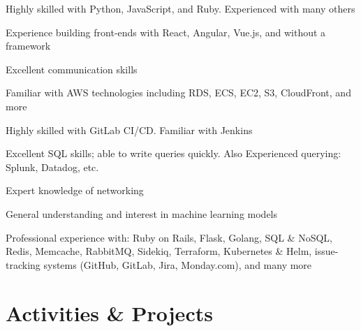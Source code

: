 \documentclass[margin,line]{resume}
\begin{document}
\begin{resume}
    \begin{list2}
        \item Highly skilled with Python, JavaScript, and Ruby. Experienced with many others
        \item Experience building front-ends with React, Angular, Vue.js, and without a framework
        \item Excellent communication skills
        \item Familiar with AWS technologies including RDS, ECS, EC2, S3, CloudFront, and more
        \item Highly skilled with GitLab CI/CD. Familiar with Jenkins
        \item Excellent SQL skills; able to write queries quickly. Also Experienced querying: Splunk, Datadog, etc.
        \item Expert knowledge of networking
        \item General understanding and interest in machine learning models
        \vspace{3mm}
        \item Professional experience with: Ruby on Rails, Flask, Golang, SQL \& NoSQL, Redis, Memcache, RabbitMQ, Sidekiq, Terraform, Kubernetes \& Helm, issue-tracking systems (GitHub, GitLab, Jira, Monday.com), and many more
    \end{list2}\vspace{-1.5mm}

\sectionline
    \section{\mysidestyle \textbf{\large{A}\small{ctivities \& Projects}}}


\end{resume}
\end{document}
